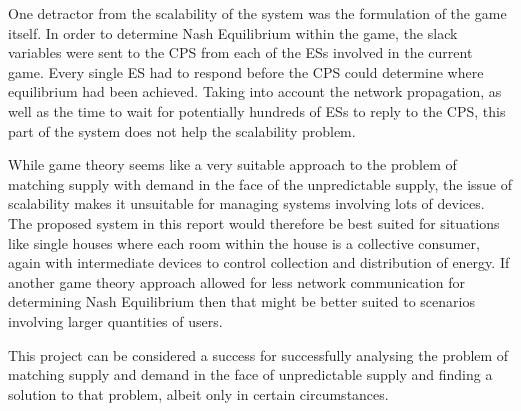 \documentclass[a4paper, notitlepage]{report}
\begin{document}
One detractor from the scalability of the system was the formulation of the game
itself. In order to determine Nash Equilibrium within the game, the slack
variables were sent to the CPS from each of the ESs involved in the current
game. Every single ES had to respond before the CPS could determine where
equilibrium had been achieved. Taking into account the network propagation, as
well as the time to wait for potentially hundreds of ESs to reply to the CPS,
this part of the system does not help the scalability problem.

While game theory seems like a very suitable approach to the problem of matching
supply with demand in the face of the unpredictable supply, the issue of
scalability makes it unsuitable for managing systems involving lots of devices.
The proposed system in this report would therefore be best suited for situations
like single houses where each room within the house is a collective consumer,
again with intermediate devices to control collection and distribution of
energy. If another game theory approach allowed for less network communication
for determining Nash Equilibrium then that might be better suited to scenarios
involving larger quantities of users.

This project can be considered a success for successfully analysing the problem
of matching supply and demand in the face of unpredictable supply and finding a
solution to that problem, albeit only in certain circumstances.

\printbibliography[heading=bibintoc, title=References]
\appendix
{}
\end{document}
